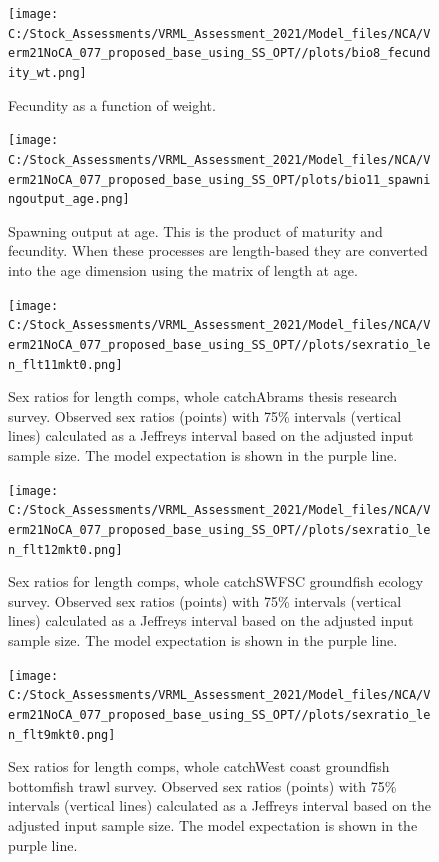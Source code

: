 \documentclass[
  english,
  a4paper,
]{article}
\begin{document}
\begin{figure}
\centering
\texttt{[image: C:/Stock\_Assessments/VRML\_Assessment\_2021/Model\_files/NCA/Verm21NoCA\_077\_proposed\_base\_using\_SS\_OPT//plots/bio8\_fecundity\_wt.png]}
\caption{Fecundity as a function of weight.\label{fig:fecundity}}
\end{figure}

\begin{figure}
\centering
\texttt{[image: C:/Stock\_Assessments/VRML\_Assessment\_2021/Model\_files/NCA/Verm21NoCA\_077\_proposed\_base\_using\_SS\_OPT/plots/bio11\_spawningoutput\_age.png]}
\caption{Spawning output at age. This is the product of maturity and fecundity. When these processes are length-based they are converted into the age dimension using the matrix of length at age.\label{fig:spawnage}}
\end{figure}

\FloatBarrier

\begin{figure}
\centering
\texttt{[image: C:/Stock\_Assessments/VRML\_Assessment\_2021/Model\_files/NCA/Verm21NoCA\_077\_proposed\_base\_using\_SS\_OPT//plots/sexratio\_len\_flt11mkt0.png]}
\caption{Sex ratios for length comps, whole catchAbrams thesis research survey. Observed sex ratios (points) with 75\% intervals (vertical lines) calculated as a Jeffreys interval based on the adjusted input sample size. The model expectation is shown in the purple line.\label{fig:sexratio-ABRAMS-RESEARCH}}
\end{figure}

\begin{figure}
\centering
\texttt{[image: C:/Stock\_Assessments/VRML\_Assessment\_2021/Model\_files/NCA/Verm21NoCA\_077\_proposed\_base\_using\_SS\_OPT//plots/sexratio\_len\_flt12mkt0.png]}
\caption{Sex ratios for length comps, whole catchSWFSC groundfish ecology survey. Observed sex ratios (points) with 75\% intervals (vertical lines) calculated as a Jeffreys interval based on the adjusted input sample size. The model expectation is shown in the purple line.\label{fig:sexratio-SWFSC-GF-ECOL}}
\end{figure}

\begin{figure}
\centering
\texttt{[image: C:/Stock\_Assessments/VRML\_Assessment\_2021/Model\_files/NCA/Verm21NoCA\_077\_proposed\_base\_using\_SS\_OPT//plots/sexratio\_len\_flt9mkt0.png]}
\caption{Sex ratios for length comps, whole catchWest coast groundfish bottomfish trawl survey. Observed sex ratios (points) with 75\% intervals (vertical lines) calculated as a Jeffreys interval based on the adjusted input sample size. The model expectation is shown in the purple line.\label{fig:sexratio-NWFSC-TWL}}
\end{figure}
\end{document}
